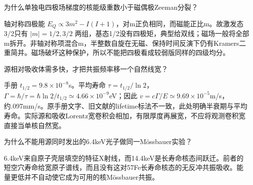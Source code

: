 \begin{exercise}\label{task:exp13-4}
为什么单独电四极场梯度的核能级重数小于磁偶极Zeeman分裂？
\end{exercise}
\begin{solution}
轴对称四极能 $E_Q\propto3m^2-I(I+1)$，对m正负相同，而磁能正比m。故激发态3/2只有 $|m|=1/2,3/2$ 两组，基态1/2没有四极矩，典型给双线；磁场一般将全部m拆开。非轴对称项混合m，半整数自旋在无磁、保持时间反演下仍有Kramers二重简并。磁场破坏这种保护，所以不能把四极看成较弱版同样的四级均分。
\end{solution}
\begin{exercise}\label{task:exp13-5}
源相对吸收体需多快，才把共振频率移一个自然线宽？
\end{exercise}
\begin{solution}
手册 $t_{1/2}=9.8\times10^{-8}$s。平均寿命 $\tau=t_{1/2}/\ln2$，$\Gamma=\hbar/\tau=\hbar\ln2/t_{1/2}\simeq4.66\times10^{-9}$eV；因此 $v=c\Gamma/E\simeq9.69\times10^{-5}$m/s，约.097mm/s。原手册文字、旧文献的lifetime标法不一致，此处明确半衰期与平均寿命。实际源和吸收Lorentz宽卷积会相加，有限厚度再展宽，不应将观测卷积宽直接当单核自然宽。
\end{solution}
\begin{exercise}\label{task:exp13-6}
为什么不能用源同时发出的6.4keV光子做同一Mössbauer实验？
\end{exercise}
\begin{solution}
6.4keV来自原子壳层填空的特征X射线，而14.4keV是长寿命核态间跃迁。前者的短空穴寿命给宽原子谱线，而且没有这对57Fe长寿命核态的无反冲共振吸收。能量更低并不自动使它成为可用的核Mössbauer共振。
\end{solution}

